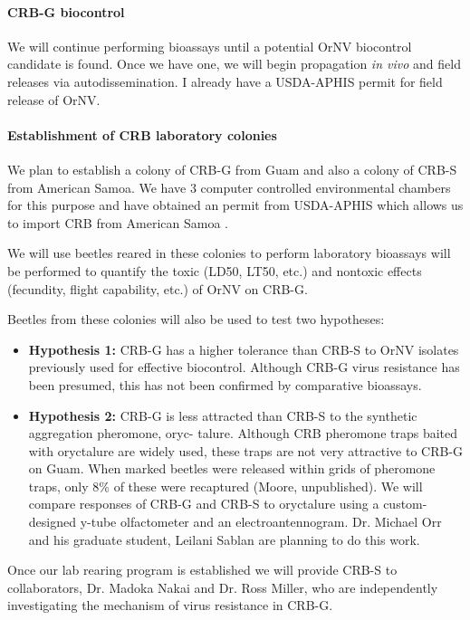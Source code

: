 \begin{refsection}
\paragraph{CRB-G biocontrol} We will continue performing bioassays until a potential OrNV biocontrol candidate is found. Once we have one, we will begin propagation \textit{in vivo} and field releases via autodissemination. I already have a USDA-APHIS permit for field release of OrNV.

\paragraph{Establishment of CRB laboratory colonies} We plan to establish a colony of CRB-G from
Guam and also a colony of CRB-S from American Samoa. We have 3 computer controlled environmental chambers for this purpose and have obtained an permit from USDA-APHIS which allows us to import CRB from American Samoa \cite{usda-aphis_crb_2019,moore_additional_2019}.

We will use beetles reared in these colonies to perform laboratory bioassays will be performed to quantify the toxic (LD50, LT50, etc.)
and nontoxic effects (fecundity, flight capability, etc.) of OrNV on CRB-G.

Beetles from these colonies will also be used to test two hypotheses:
\begin{itemize}
	\item \textbf{Hypothesis 1:} CRB-G has a higher tolerance than CRB-S to OrNV isolates previously used for effective biocontrol. Although CRB-G virus resistance has been presumed, this has not been confirmed
	by comparative bioassays.
	\item \textbf{Hypothesis 2:} CRB-G is less attracted than CRB-S to the synthetic aggregation pheromone, oryc-
	talure. Although CRB pheromone traps baited with oryctalure are widely used, these traps are not
	very attractive to CRB-G on Guam. When marked beetles were released within grids of pheromone
	traps, only 8\% of these were recaptured (Moore, unpublished). We will compare responses of CRB-G
	and CRB-S to oryctalure using a custom-designed y-tube olfactometer and an electroantennogram.
	Dr. Michael Orr and his graduate student, Leilani Sablan are planning to do this work.
\end{itemize}

Once our lab rearing program is established we will provide CRB-S to collaborators, Dr. Madoka Nakai
and Dr. Ross Miller, who are independently investigating the mechanism of virus resistance in CRB-G.


\end{refsection}
